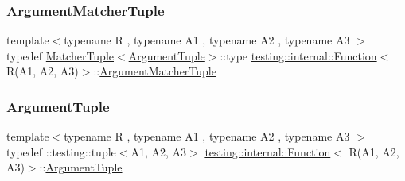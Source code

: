 \mbox{\label{structtesting_1_1internal_1_1_function_3_01_r_07_a1_00_01_a2_00_01_a3_08_4_acb08fa0fffe1213ce88f53343bb3b564}} 
\subsubsection{\texorpdfstring{ArgumentMatcherTuple}{ArgumentMatcherTuple}}
{\footnotesize\ttfamily template$<$typename R , typename A1 , typename A2 , typename A3 $>$ \\
typedef \mbox{\hyperlink{structtesting_1_1internal_1_1_matcher_tuple}{Matcher\+Tuple}}$<$\mbox{\hyperlink{structtesting_1_1internal_1_1_function_3_01_r_07_08_4_ad483c3128c470d8cdb55c3ac1c575c11}{Argument\+Tuple}}$>$\+::type \mbox{\hyperlink{structtesting_1_1internal_1_1_function}{testing\+::internal\+::\+Function}}$<$ R(A1, A2, A3)$>$\+::\mbox{\hyperlink{structtesting_1_1internal_1_1_function_3_01_r_07_08_4_a9bec5cf8937e8af99dedab2f40129fab}{Argument\+Matcher\+Tuple}}}

\mbox{\label{structtesting_1_1internal_1_1_function_3_01_r_07_a1_00_01_a2_00_01_a3_08_4_a6f1e1097947a9e13a4e29099a61de804}} 
\subsubsection{\texorpdfstring{ArgumentTuple}{ArgumentTuple}}
{\footnotesize\ttfamily template$<$typename R , typename A1 , typename A2 , typename A3 $>$ \\
typedef \+::testing\+::tuple$<$A1, A2, A3$>$ \mbox{\hyperlink{structtesting_1_1internal_1_1_function}{testing\+::internal\+::\+Function}}$<$ R(A1, A2, A3)$>$\+::\mbox{\hyperlink{structtesting_1_1internal_1_1_function_3_01_r_07_08_4_ad483c3128c470d8cdb55c3ac1c575c11}{Argument\+Tuple}}}


